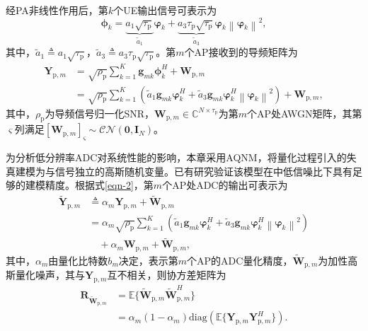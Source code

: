 经PA非线性作用后，第$k$个UE输出信号可表示为
\begin{equation}
\label{eqn-1}
\boldsymbol{\phi}_k = \underset{\tilde{a}_1}{\underbrace{a_1\sqrt{\tau_\text{p}}}}\boldsymbol{\varphi}_k + \underset{\tilde{a}_3}{\underbrace{a_3\tau_\text{p}\sqrt{\tau_\text{p}}}}\boldsymbol{\varphi}_k\left\|\boldsymbol{\varphi}_k\right\|^2,
\end{equation}
其中，$\tilde{a}_1\triangleq a_1\sqrt{\tau_\text{p}}$，$\tilde{a}_3\triangleq a_3\tau_\text{p}\sqrt{\tau_\text{p}}$。第$m$个AP接收到的导频矩阵为
\begin{equation}
\label{eqn-2}
\begin{aligned}
\mathbf{Y}_{\text{p},m} &= \sqrt{\rho_\text{p}}\sum_{k=1}^{K}\mathbf{g}_{mk}\boldsymbol{\phi}_k^H + \mathbf{W}_{\text{p},m} \\
&= \sqrt{\rho_\text{p}}\sum_{k=1}^{K}(\tilde{a}_1\mathbf{g}_{mk}\boldsymbol{\varphi}_k^H + \tilde{a}_3\mathbf{g}_{mk}\boldsymbol{\varphi}_k^H\left\|\boldsymbol{\varphi}_k\right\|^2) + \mathbf{W}_{\text{p},m},
\end{aligned}
\end{equation}
其中，$\rho_\text{p}$为导频信号归一化SNR，$\mathbf{W}_{\text{p},m}\in\mathbb{C}^{N\times\tau_\text{p}}$为第$m$个AP处AWGN矩阵，其第$\varsigma$列满足$[\mathbf{W}_{\text{p},m}]_\varsigma\sim\mathcal{CN}(\mathbf{0},\mathbf{I}_N)$。

为分析低分辨率ADC对系统性能的影响，本章采用AQNM，将量化过程引入的失真建模为与信号独立的高斯随机变量。已有研究验证该模型在中低信噪比下具有足够的建模精度\cite{chapterthree7,chapterthree8}。根据式\eqref{eqn-2}，第$m$个AP处ADC的输出可表示为
\begin{align}
\label{eqn-3}
\tilde{\mathbf{Y}}_{\text{p},m}& \triangleq\alpha_m\mathbf{Y}_{\text{p},m}+\tilde{\mathbf{W}}_{\text{p},m}\nonumber\\
&=\alpha_m\sqrt{\rho_\text{p}}\sum_{k=1}^{K}(\tilde{a}_1\mathbf{g}_{mk}\boldsymbol{\varphi}_k^H+\tilde{a}_3\mathbf{g}_{mk}\boldsymbol{\varphi}_k^H\left\|\boldsymbol{\varphi}_k\right\|^2)\nonumber\\
&\quad +\alpha_m\mathbf{W}_{\text{p},m}+\tilde{\mathbf{W}}_{\text{p},m},
\end{align}
其中，$\alpha_m$由量化比特数$b_m$决定，表示第$m$个AP的ADC量化精度\cite{chapterthree9}，$\tilde{\mathbf{W}}_{\text{p},m}$为加性高斯量化噪声，其与$\mathbf{Y}_{\text{p},m}$互不相关，则协方差矩阵为
\begin{align}
\label{eqn-4}
\mathbf{R}_{\tilde{\mathbf{W}}_{\text{p},m}}&=\mathbb{E}\{\tilde{\mathbf{W}}_{\text{p},m}\tilde{\mathbf{W}}_{\text{p},m}^H\}\nonumber\\
&={\alpha_m}(1-\alpha_m)\text{diag}(\mathbb{E}\{\mathbf{Y}_{\text{p},m}\mathbf{Y}_{\text{p},m}^H\}).
\end{align}


